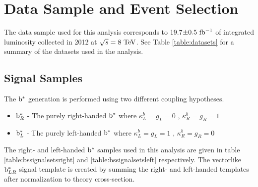 \chapter{Data Sample and Event Selection}
\label{sec:bsdatasampleAndSelection}
The data sample used for this analysis corresponds to 19.7$\pm0.5~\mathrm{fb^{-1}}$ of integrated 
luminosity collected in 2012 at $\sqrt{s} = 8~\mathrm{TeV}$.  See Table \ref{table:datasets} for a summary of the datasets used in the analysis.

\section{Signal Samples}
\label{sec:bssignal}


The $\mathrm{b}^{*}$ generation is performed using two different coupling hypotheses. 
\begin{itemize}
\item {\bf $\mathrm{b}^{*}_{R}$} - The purely right-handed $\mathrm{b}^{*}$ where $\kappa_{L}^{b}=g_{L}=0$ , $\kappa_{R}^{b}=g_{R}=1$ 
\item {\bf $\mathrm{b}^{*}_{L}$} - The purely left-handed $\mathrm{b}^{*}$ where $\kappa_{L}^{b}=g_{L}=1$ , $\kappa_{R}^{b}=g_{R}=0$ 
\end{itemize}

The right- and left-handed $\mathrm{b}^{*}$ samples used in this analysis are given in table
\ref{table:bssignalsetsright} and \ref{table:bssignalsetsleft} respectively. The vectorlike $\mathrm{b}^{*}_{LR}$ signal 
template is created by summing the right- and left-handed templates after normalization to theory cross-section.

